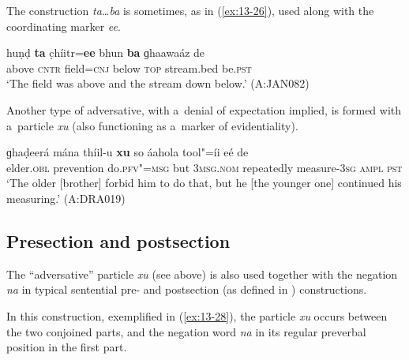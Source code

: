 The construction \textit{ta{\ldots}ba} is sometimes, as in (\ref{ex:13-26}), used along with the coordinating marker \textit{ee}.

\begin{exe}
\ex
\label{ex:13-26}
\gll huṇḍ \textbf{ta} c̣híitr=\textbf{ee} bhun \textbf{ba} ɡhaawaáz de \\
above \textsc{cntr} field=\textsc{cnj} below \textsc{top} stream.bed be.\textsc{pst} \\
\glt `The field was above and the stream down below.' (A:JAN082) 
\end{exe}


 Another type of adversative, with a~denial of expectation implied, is formed with a~particle \textit{xu} (also functioning as a~marker of evidentiality).

\begin{exe}
\ex
\label{ex:13-27}
\gll ɡhaḍeerá mána thíil-u \textbf{xu} so áahola tool"=íi eé de\\
elder.\textsc{obl} prevention do.\textsc{pfv"=msg} but \textsc{3msg.nom} repeatedly measure-\textsc{3sg} \textsc{ampl}{\protect\footnotemark} \textsc{pst} \\
\glt `The older [brother] forbid him to do that, but he [the younger one] continued his measuring.' (A:DRA019)
\end{exe}


\subsection{Presection and postsection}
\label{subsec:13-2-2}

The ``adversative'' particle \textit{xu} (see above) is also used together with the negation \textit{na} in typical sentential pre- and postsection (as defined in ) constructions.


 In this construction, exemplified in (\ref{ex:13-28}), the particle \textit{xu} occurs between the two conjoined parts, and the negation word \textit{na} in its regular preverbal position in the first part.

